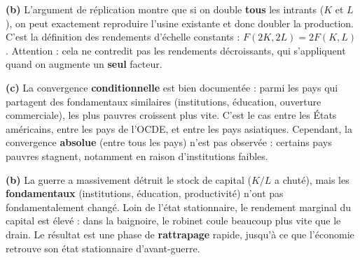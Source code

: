 \begin{reponse}
\textbf{(b)} L'argument de réplication montre que si on double \textbf{tous} les intrants ($K$ et $L$), on peut exactement reproduire l'usine existante et donc doubler la production. C'est la définition des rendements d'échelle constants : $F(2K, 2L) = 2F(K, L)$. Attention : cela ne contredit pas les rendements décroissants, qui s'appliquent quand on augmente un \textbf{seul} facteur.
\end{reponse}


\begin{reponse}
\textbf{(c)} La convergence \textbf{conditionnelle} est bien documentée : parmi les pays qui partagent des fondamentaux similaires (institutions, éducation, ouverture commerciale), les plus pauvres croissent plus vite. C'est le cas entre les États américains, entre les pays de l'OCDE, et entre les pays asiatiques. Cependant, la convergence \textbf{absolue} (entre tous les pays) n'est pas observée : certains pays pauvres stagnent, notamment en raison d'institutions faibles.
\end{reponse}


\begin{reponse}
\textbf{(b)} La guerre a massivement détruit le stock de capital ($K/L$ a chuté), mais les \textbf{fondamentaux} (institutions, éducation, productivité) n'ont pas fondamentalement changé. Loin de l'état stationnaire, le rendement marginal du capital est élevé : dans la baignoire, le robinet coule beaucoup plus vite que le drain. Le résultat est une phase de \textbf{rattrapage} rapide, jusqu'à ce que l'économie retrouve son état stationnaire d'avant-guerre.
\end{reponse}

